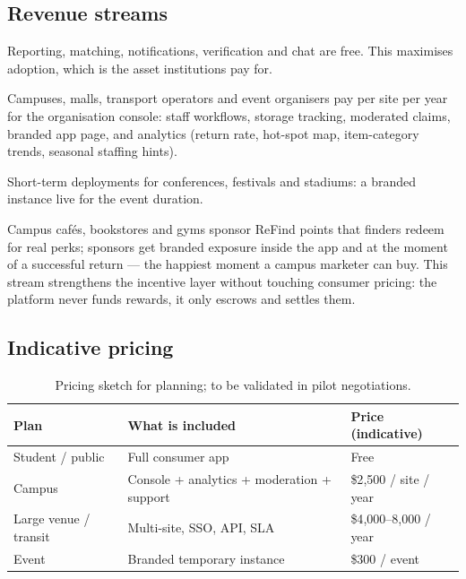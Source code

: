 \documentclass[11pt,a4paper]{article}
\begin{document}
\subsection{Revenue streams}

\begin{description}[style=nextline,leftmargin=1.2em]
  \item[Free for individuals (forever).] Reporting, matching, notifications, verification
        and chat are free. This maximises adoption, which is the asset institutions pay
        for.
  \item[Organisation subscription (B2B SaaS).] Campuses, malls, transport operators and
        event organisers pay per site per year for the organisation console: staff
        workflows, storage tracking, moderated claims, branded app page, and analytics
        (return rate, hot-spot map, item-category trends, seasonal staffing hints).
  \item[Event packages (optional add-on).] Short-term deployments for conferences,
        festivals and stadiums: a branded instance live for the event duration.
  \item[Merchant-sponsored reward pool.] Campus caf\'es, bookstores and gyms sponsor
        ReFind points that finders redeem for real perks; sponsors get branded exposure
        inside the app and at the moment of a successful return --- the happiest moment a
        campus marketer can buy. This stream strengthens the incentive layer without
        touching consumer pricing: the platform never funds rewards, it only escrows and
        settles them.
\end{description}

\subsection{Indicative pricing}

\begin{table}[H]
\centering
\small
\renewcommand{\arraystretch}{1.3}
\begin{tabularx}{\textwidth}{l Y l}
\toprule
\textbf{Plan} & \textbf{What is included} & \textbf{Price (indicative)} \\
\midrule
Student / public & Full consumer app & Free \\
Campus & Console + analytics + moderation + support & \$2{,}500 / site / year \\
Large venue / transit & Multi-site, SSO, API, SLA & \$4{,}000--8{,}000 / year \\
Event & Branded temporary instance & \$300 / event \\
\bottomrule
\end{tabularx}
\caption{Pricing sketch for planning; to be validated in pilot negotiations.}
\end{table}
\end{document}
